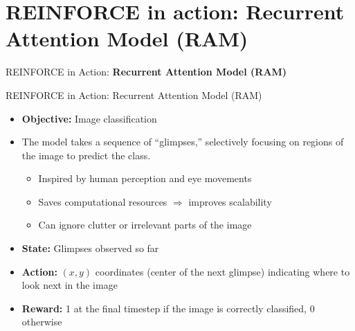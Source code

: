 \section{REINFORCE in action: Recurrent Attention Model (RAM)}
\begin{frame}{}
    \LARGE REINFORCE in Action: \textbf{Recurrent Attention Model (RAM)}
\end{frame}

\begin{frame}{REINFORCE in Action: Recurrent Attention Model (RAM)}
    \begin{itemize}
        \item \textbf{Objective:} Image classification
        \item The model takes a sequence of “glimpses,” selectively focusing on regions of the image to predict the class.
        \begin{itemize}
            \item Inspired by human perception and eye movements
            \item Saves computational resources $\Rightarrow$ improves scalability
            \item Can ignore clutter or irrelevant parts of the image
        \end{itemize}
        \item \textbf{State:} Glimpses observed so far
        \item \textbf{Action:} $(x, y)$ coordinates (center of the next glimpse) indicating where to look next in the image
        \item \textbf{Reward:} 1 at the final timestep if the image is correctly classified, 0 otherwise
    \end{itemize}
    \footnotetext{[Mnih et al., 2014]}
\end{frame}

